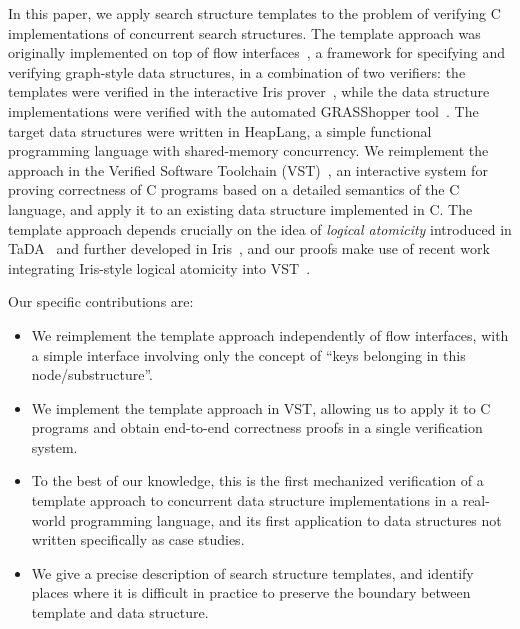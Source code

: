 \documentclass[sigplan,screen]{acmart}
\begin{document}

In this paper, we apply search structure templates to the problem of verifying C implementations of concurrent search structures. The template approach was originally implemented on top of flow interfaces~\cite{krishna2017flow}, a framework for specifying and verifying graph-style data structures, in a combination of two verifiers: the templates were verified in the interactive Iris prover~\cite{iris}, while the data structure implementations were verified with the automated GRASShopper tool~\cite{grasshopper}. The target data structures were written in HeapLang, a simple functional programming language with shared-memory concurrency. We reimplement the approach in the Verified Software Toolchain (VST)~\cite{plcc}, an interactive system for proving correctness of C programs based on a detailed semantics of the C language, and apply it to an existing data structure implemented in C. The template approach depends crucially on the idea of \emph{logical atomicity} introduced in TaDA~\cite{tada} and further developed in Iris~\cite{iris}, and our proofs make use of recent work integrating Iris-style logical atomicity into VST~\cite{iris-vst-arxiv}. %

Our specific contributions are:
\begin{itemize}
	\item We reimplement the template approach independently of flow interfaces, with a simple interface involving only the concept of ``keys belonging in this node/substructure''.
	\item We implement the template approach in VST, allowing us to apply it to C programs and obtain end-to-end correctness proofs in a single verification system.
	\item To the best of our knowledge, this is the first mechanized verification of a template approach to concurrent data structure implementations in a real-world programming language, and its first application to data structures not written specifically as case studies.
	\item We give a precise description of search structure templates, and identify places where it is difficult in practice to preserve the boundary between template and data structure.
\end{itemize}
\end{document}
